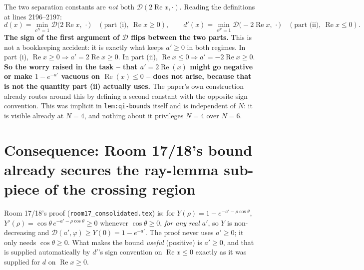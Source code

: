 \documentclass[11pt]{article}
\begin{document}
The two separation constants are \emph{not} both $\mathcal D(2\operatorname{Re}x,\cdot)$. Reading
the definitions at lines 2196--2197:
\[
 d(x)=\min_{c^N=1}\mathcal D\bigl(2\operatorname{Re}x,\,\cdot\bigr)\quad(\text{part (i)},\
 \operatorname{Re}x\ge0),
 \qquad
 d'(x)=\min_{c^N=1}\mathcal D\bigl(-2\operatorname{Re}x,\,\cdot\bigr)\quad(\text{part (ii)},\
 \operatorname{Re}x\le0).
\]
\textbf{The sign of the first argument of $\mathcal D$ flips between the two parts.} This is not
a bookkeeping accident: it is exactly what keeps $a'\ge0$ in both regimes. In part (i),
$\operatorname{Re}x\ge0\Rightarrow a'=2\operatorname{Re}x\ge0$. In part (ii),
$\operatorname{Re}x\le0\Rightarrow a'=-2\operatorname{Re}x\ge0$. \textbf{So the worry raised in
the task -- that $a'=2\operatorname{Re}(x)$ might go negative or make $1-e^{-a'}$ vacuous on
$\operatorname{Re}(x)\le0$ -- does not arise, because that is not the quantity part (ii) actually
uses.} The paper's own construction already routes around this by defining a second constant
with the opposite sign convention. This was implicit in \texttt{lem:qi-bounds} itself and is
independent of $N$: it is visible already at $N=4$, and nothing about it privileges $N=4$ over
$N=6$.

\section*{Consequence: Room 17/18's bound already secures the ray-lemma sub-piece of the
crossing region}

Room 17/18's proof (\texttt{room17\_consolidated.tex}) is: for $Y(\rho)=1-e^{-a'-\rho\cos\theta}$,
$Y'(\rho)=\cos\theta\,e^{-a'-\rho\cos\theta}\ge0$ whenever $\cos\theta\ge0$, \emph{for any real
$a'$}, so $Y$ is non-decreasing and $\mathcal D(a',\varphi)\ge Y(0)=1-e^{-a'}$. The proof never
uses $a'\ge0$; it only needs $\cos\theta\ge0$. What makes the bound \emph{useful} (positive) is
$a'\ge0$, and that is supplied automatically by $d'$'s sign convention on $\operatorname{Re}x\le0$
exactly as it was supplied for $d$ on $\operatorname{Re}x\ge0$.
\end{document}
